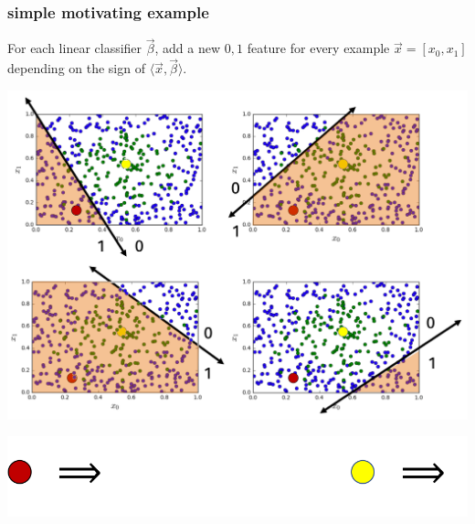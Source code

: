 \documentclass[handout,compress]{beamer}
\begin{document}
\begin{frame}
	\frametitle{simple motivating example}
	For each linear classifier $\vec{\beta}$, add a new $0, 1$ feature for every example $\vec{x} = [x_0,x_1]$ depending on the sign of $\langle \vec{x}, \vec{\beta}\rangle$.
	\vspace{-1em}
	\begin{center}
		\includegraphics[width=.8\textwidth]{sep_more_formal.png}
	\end{center}
	\vspace{-1em}
	\includegraphics[width=.6\textwidth]{new_features.png}
\end{frame}
\end{document}
